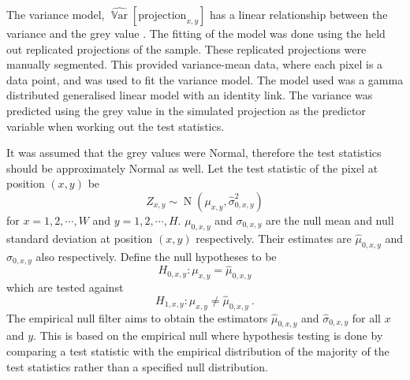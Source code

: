 \documentclass{proc}
\DeclareMathOperator{\variance}{\mathbb{V}ar}
\DeclareMathOperator{\normal}{N}
\begin{document}
The variance model, $\widehat{\variance}\left[\text{projection}_{x,y}\right]$ has a linear relationship between the variance and the grey value \citep{yang2010noise}. The fitting of the model was done using the held out replicated projections of the sample. These replicated projections were manually segmented. This provided variance-mean data, where each pixel is a data point, and was used to fit the variance model. The model used was a gamma distributed generalised linear model \citep{nelder1972generalized, mccullagh1984generalized} with an identity link. The variance was predicted using the grey value in the simulated projection as the predictor variable when working out the test statistics.

It was assumed that the grey values were Normal, therefore the test statistics should be approximately Normal as well. Let the test statistic of the pixel at position $(x,y)$ be
\begin{equation}
Z_{x,y}\sim\normal(\mu_{x,y},\widehat{\sigma}_{0,x,y}^2)
\end{equation}
for $x=1,2,\cdots,W$ and $y=1,2,\cdots,H$. $\mu_{0,x,y}$ and $\sigma_{0,x,y}$ are the null mean and null standard deviation at position $(x,y)$ respectively. Their estimates are $\widehat{\mu}_{0,x,y}$ and $\widehat{\sigma}_{0,x,y}$ also respectively. Define the null hypotheses to be
\begin{equation}
  H_{0,x,y}:\mu_{x,y}=\widehat{\mu}_{0,x,y}
\end{equation}
which are tested against
\begin{equation}
  H_{1,x,y}:\mu_{x,y}\neq\widehat{\mu}_{0,x,y} \ .
\end{equation}
The empirical null filter aims to obtain the estimators $\widehat{\mu}
_{0,x,y}$ and $\widehat{\sigma}_{0,x,y}$ for all $x$ and $y$. This is based on the empirical null \citep{efron2004large} where hypothesis testing is done by comparing a test statistic with the empirical distribution of the majority of the test statistics rather than a specified null distribution.
\end{document}
